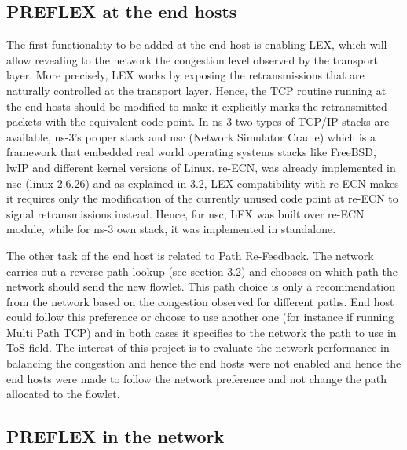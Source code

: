 \subsection{PREFLEX at the end hosts}

The first functionality to be added at the end host is enabling LEX, which will allow revealing to the network the congestion level observed by the transport layer. More precisely, LEX works by exposing the retransmissions that are naturally controlled at the transport layer.  Hence, the TCP routine running at the end hosts should be modified to make it explicitly marks the retransmitted packets with the equivalent code point. In ns-3 two types of TCP/IP stacks are available, ns-3's proper stack and nsc (Network Simulator Cradle) which is a framework that embedded real world operating systems stacks like FreeBSD, lwIP and different kernel versions of Linux. re-ECN, was already implemented in nsc (linux-2.6.26) and as explained in 3.2, LEX compatibility with re-ECN makes it requires only the modification of the currently unused code point at re-ECN to signal retransmissions instead. Hence, for nsc, LEX was built over re-ECN module, while for ns-3 own stack, it was implemented in standalone.

The other task of the end host is related to Path Re-Feedback. The network carries out a reverse path lookup (see section 3.2) and chooses on which path the network should send the new flowlet. This path choice is only a recommendation from the network based on the congestion observed  for different paths. End host could follow this preference or choose to use another one (for instance if running Multi Path TCP) and in both cases it specifies to the network the path to use in ToS field. The interest of this project is to evaluate the network performance in balancing the congestion and hence the end hosts were not enabled and hence the end hosts were made to follow the network preference and not change the path allocated to the flowlet. 

\subsection{PREFLEX in the network}

